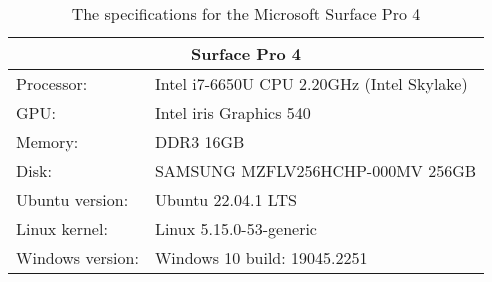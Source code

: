 \begin{table}[H]
    \centering
    \begin{tabular}{ll}
    \hline
    \multicolumn{2}{|c|}{Surface Pro 4}           \\ \hline
    Processor: & Intel i7-6650U CPU 2.20GHz (Intel Skylake) \\
    GPU:       & Intel iris Graphics 540          \\
    Memory:    & DDR3 16GB                         \\
    Disk:      & SAMSUNG MZFLV256HCHP-000MV 256GB   \\
    Ubuntu version:  & Ubuntu 22.04.1 LTS                   \\
    Linux kernel: & Linux 5.15.0-53-generic      \\
    Windows version:& Windows 10 build: 19045.2251
    \end{tabular}
    \caption{The specifications for the Microsoft Surface Pro 4}
    \label{tab:surfacePro}
\end{table} 
